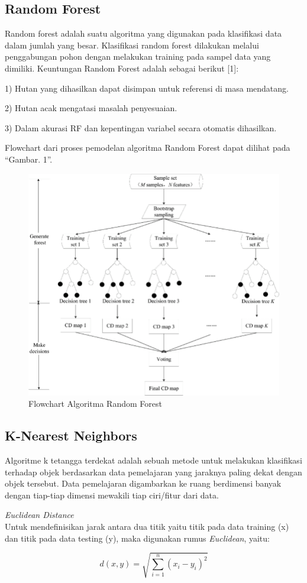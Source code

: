 \documentclass[conference]{IEEEtran}
\begin{document}
\subsection{Random Forest}\label{AA}
Random forest adalah suatu algoritma yang digunakan pada klasifikasi data dalam jumlah yang besar. Klasifikasi random forest dilakukan melalui penggabungan pohon dengan melakukan training pada sampel data yang dimiliki.
Keuntungan Random Forest adalah sebagai berikut [1]:

1) Hutan yang dihasilkan dapat disimpan untuk referensi
di masa mendatang.

2) Hutan acak mengatasi masalah penyesuaian.

3) Dalam akurasi RF dan kepentingan variabel secara
otomatis dihasilkan.

Flowchart dari proses pemodelan algoritma Random Forest
dapat dilihat pada “Gambar. 1”.

\begin{figure}
\centering
\includegraphics[width=.4\textwidth]{Gambar/gambar1.png}
\caption{Flowchart Algoritma Random Forest}
\end{figure}

\subsection{K-Nearest Neighbors}

Algoritme k tetangga terdekat adalah sebuah metode untuk melakukan klasifikasi terhadap objek berdasarkan data pemelajaran yang jaraknya paling dekat dengan objek tersebut. Data pemelajaran digambarkan ke ruang berdimensi banyak dengan tiap-tiap dimensi mewakili tiap ciri/fitur dari data.

\noindent\emph{Euclidean Distance}\\
Untuk mendefinisikan jarak antara dua titik yaitu titik pada data training (x) dan titik pada data testing (y), maka digunakan rumus \emph{Euclidean}\cite{nurhadi2017aplikasi}, yaitu:

\begin{equation*}
d(x,y)=\sqrt{\sum^{n}_{i=1} (x_i-y_i)^2}
\label{eq1}
\end{equation*}
\end{document}
